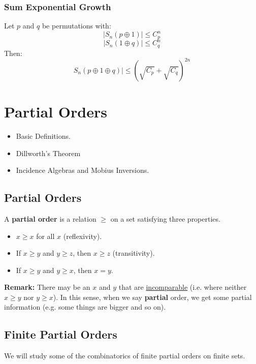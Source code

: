 \documentclass[letterpaper]{article}
\begin{document}
\subsubsection{Sum Exponential Growth}
\begin{theorem}{}{}
    Let $p$ and $q$ be permutations with:
    \[|S_{n}(p \oplus 1)| \leq C_{p}^n\]
    \[|S_{n}(1 \oplus q)| \leq C_{q}^n\]
    Then:
    \[S_{n}(p \oplus 1 \oplus q)| \leq (\sqrt{C_p} + \sqrt{C_q})^{2n}\]
\end{theorem}


\newpage 

\section{Partial Orders}
\begin{itemize}
    \item Basic Definitions. 
    \item Dillworth's Theorem
    \item Incidence Algebras and Mobius Inversions. 
\end{itemize}

\subsection{Partial Orders}
\begin{definition}{}{}
    A \textbf{partial order} is a relation $\geq$ on a set satisfying three properties. 
    \begin{itemize}
        \item $x \geq x$ for all $x$ (reflexivity). 
        \item If $x \geq y$ and $y \geq z$, then $x \geq z$ (transitivity). 
        \item If $x \geq y$ and $y \geq x$, then $x = y$. 
    \end{itemize}
\end{definition}

\textbf{Remark:} There may be an $x$ and $y$ that are \underline{incomparable} (i.e. where neither $x \geq y$ nor $y \geq x$). In this sense, when we say \textbf{partial} order, we get some partial information (e.g. some things are bigger and so on). 


\subsection{Finite Partial Orders}
We will study some of the combinatorics of finite partial orders on finite sets. 
\end{document}
